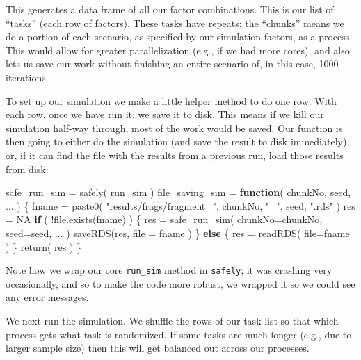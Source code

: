 \documentclass[
]{book}
\newenvironment{Shaded}{\begin{snugshade}}{\end{snugshade}}
\newcommand{\AttributeTok}[1]{\textcolor[rgb]{0.77,0.63,0.00}{#1}}
\newcommand{\ConstantTok}[1]{\textcolor[rgb]{0.00,0.00,0.00}{#1}}
\newcommand{\ControlFlowTok}[1]{\textcolor[rgb]{0.13,0.29,0.53}{\textbf{#1}}}
\newcommand{\FunctionTok}[1]{\textcolor[rgb]{0.00,0.00,0.00}{#1}}
\newcommand{\NormalTok}[1]{#1}
\newcommand{\OtherTok}[1]{\textcolor[rgb]{0.56,0.35,0.01}{#1}}
\newcommand{\SpecialCharTok}[1]{\textcolor[rgb]{0.00,0.00,0.00}{#1}}
\newcommand{\StringTok}[1]{\textcolor[rgb]{0.31,0.60,0.02}{#1}}
\begin{document}
This generates a data frame of all our factor combinations.
This is our list of ``tasks'' (each row of factors).
These tasks have repeats: the ``chunks'' means we do a portion of each scenario, as specified by our simulation factors, as a process.
This would allow for greater parallelization (e.g., if we had more cores), and also lets us save our work without finishing an entire scenario of, in this case, 1000 iterations.

To set up our simulation we make a little helper method to do one row.
With each row, once we have run it, we save it to disk.
This means if we kill our simulation half-way through, most of the work would be saved.
Our function is then going to either do the simulation (and save the result to disk immediately), or, if it can find the file with the results from a previous run, load those results from disk:

\begin{Shaded}
\begin{Highlighting}[]
\NormalTok{safe\_run\_sim }\OtherTok{=} \FunctionTok{safely}\NormalTok{( run\_sim )}
\NormalTok{file\_saving\_sim }\OtherTok{=} \ControlFlowTok{function}\NormalTok{( chunkNo, seed, ... ) \{}
\NormalTok{    fname }\OtherTok{=} \FunctionTok{paste0}\NormalTok{( }\StringTok{"results/frags/fragment\_"}\NormalTok{, chunkNo, }\StringTok{"\_"}\NormalTok{, seed, }\StringTok{".rds"}\NormalTok{ )}
\NormalTok{    res }\OtherTok{=} \ConstantTok{NA}
    \ControlFlowTok{if}\NormalTok{ ( }\SpecialCharTok{!}\FunctionTok{file.exists}\NormalTok{(fname) ) \{}
\NormalTok{        res }\OtherTok{=} \FunctionTok{safe\_run\_sim}\NormalTok{( }\AttributeTok{chunkNo=}\NormalTok{chunkNo, }\AttributeTok{seed=}\NormalTok{seed, ... )}
        \FunctionTok{saveRDS}\NormalTok{(res, }\AttributeTok{file =}\NormalTok{ fname )}
\NormalTok{    \} }\ControlFlowTok{else}\NormalTok{ \{}
\NormalTok{        res }\OtherTok{=} \FunctionTok{readRDS}\NormalTok{( }\AttributeTok{file=}\NormalTok{fname )}
\NormalTok{    \}}
    \FunctionTok{return}\NormalTok{( res )}
\NormalTok{\}}
\end{Highlighting}
\end{Shaded}

Note how we wrap our core \texttt{run\_sim} method in \texttt{safely}; it was crashing very occasionally, and so to make the code more robust, we wrapped it so we could see any error messages.

We next run the simulation.
We shuffle the rows of our task list so that which process gets what task is randomized.
If some tasks are much longer (e.g., due to larger sample size) then this will get balanced out across our processes.
\end{document}
